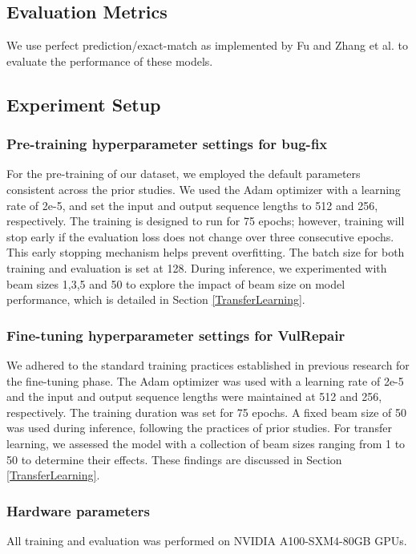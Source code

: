 \subsection{Evaluation Metrics}
We use perfect prediction/exact-match as implemented by Fu and Zhang et al.\cite{fu2022vulrepair,zhang2023pre} to evaluate the performance of these models.

\subsection{Experiment Setup}
\subsubsection{Pre-training hyperparameter settings for bug-fix}\label{Pre-training-hyperparameters}
For the pre-training of our dataset, we employed the default parameters consistent across the prior studies.
We used the Adam optimizer with a learning rate of 2e-5, and set the input and output sequence lengths to 512 and 256, respectively.
The training is designed to run for 75 epochs; however, training will stop early if the evaluation loss does not change over three consecutive epochs.
This early stopping mechanism helps prevent overfitting.
The batch size for both training and evaluation is set at 128.
During inference, we experimented with beam sizes 1,3,5 and 50 to explore the impact of beam size on model performance, which is detailed in Section \ref{TransferLearning}.

\subsubsection{Fine-tuning hyperparameter settings for VulRepair}\label{Fine-tuning-hyperparameters}
We adhered to the standard training practices established in previous research for the fine-tuning phase. The Adam optimizer was used with a learning rate of 2e-5 and the input and output sequence lengths were maintained at 512 and 256, respectively. The training duration was set for 75 epochs. A fixed beam size of 50 was used during inference, following the practices of prior studies. For transfer learning, we assessed the model with a collection of beam sizes ranging from 1 to 50 to determine their effects. These findings are discussed in Section \ref{TransferLearning}.

\subsubsection{Hardware parameters}
All training and evaluation was performed on NVIDIA A100-SXM4-80GB GPUs.

